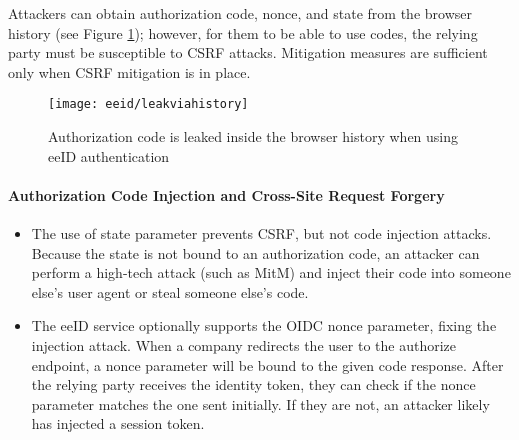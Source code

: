 Attackers can obtain authorization code, nonce, and state from the browser history (see Figure \ref{fig:eeid-leakviahistory}); however, for them to be able to use codes, the relying party must be susceptible to CSRF attacks. Mitigation measures are sufficient only when CSRF mitigation is in place.

\begin{figure}
  \centering
  \texttt{[image: eeid/leakviahistory]}
  \caption{Authorization code is leaked inside the browser history when using eeID authentication}
  \label{fig:eeid-leakviahistory}
\end{figure}

\paragraph{Authorization Code Injection and Cross-Site Request Forgery}

\begin{itemize}
  \item The use of state parameter prevents CSRF, but not code injection attacks. Because the state is not bound to an authorization code, an attacker can perform a high-tech attack (such as MitM) and inject their code into someone else's user agent or steal someone else's code.
  \item The eeID service optionally supports the OIDC nonce parameter, fixing the injection attack. When a company redirects the user to the {authorize} endpoint, a nonce parameter will be bound to the given code response. After the relying party receives the identity token, they can check if the nonce parameter matches the one sent initially. If they are not, an attacker likely has injected a session token.
\end{itemize}

